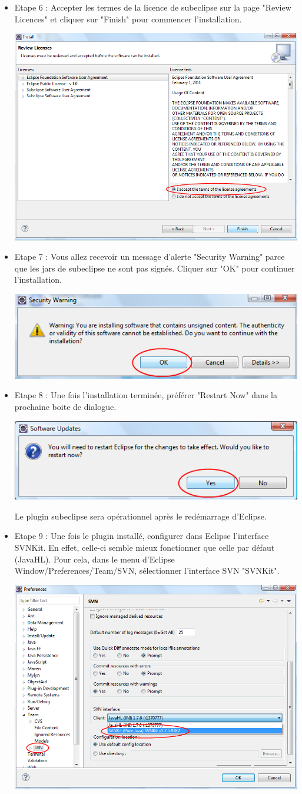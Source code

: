 \begin{itemize}[leftmargin=* ,parsep=0cm,itemsep=0cm,topsep=0cm]
\item Etape 6 : Accepter les termes de la licence de subeclipse sur la page "Review Licences" et cliquer sur "Finish" pour commencer l'installation.
\begin{center}
\includegraphics[width=0.4\linewidth]{../../resources/images/guide_installation/subeclipseEtape3.png}
\end{center}

\item Etape 7 : Vous allez recevoir un message d'alerte "Security Warning" parce que les jars de subeclipse ne sont pas sign\'es. Cliquer sur "OK" pour continuer l'installation.
\begin{center}
\includegraphics[width=0.4\linewidth]{../../resources/images/guide_installation/pluginNonSigne.png}
\end{center}

\newpage

\item Etape 8 : Une fois l'installation termin\'ee, pr\'ef\'erer "Restart Now" dans la prochaine boite de dialogue. 
\begin{center}
\includegraphics[width=0.4\linewidth]{../../resources/images/guide_installation/pluginRestart.png}
\end{center}
Le plugin subeclipse sera op\'erationnel après le red\'emarrage d'Eclipse.

\bigskip

\item Etape 9 : Une fois le plugin install\'e, configurer dans Eclipse l'interface SVNKit. En effet, celle-ci semble mieux fonctionner que celle par d\'efaut (JavaHL). Pour cela, dans le menu d'Eclipse Window/Preferences/Team/SVN, s\'electionner l’interface SVN "SVNKit".
\begin{center}
\includegraphics[width=0.4\linewidth]{../../resources/images/guide_installation/subeclipseInterface.png}
\end{center}


\end{itemize}